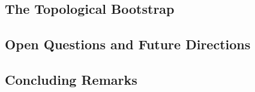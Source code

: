 \subsection{The Topological Bootstrap}

%

\subsection{Open Questions and Future Directions}

%

\subsection{Concluding Remarks}

%
%
